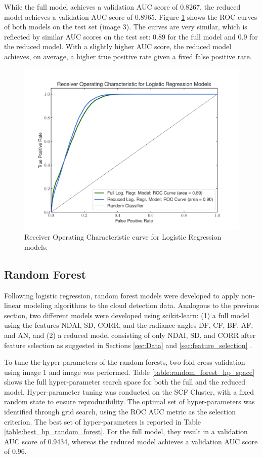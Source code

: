\documentclass[11pt,letterpaper]{article}
\begin{document}
While the full model achieves a validation AUC score of 0.8267, the reduced model achieves a validation AUC score of 0.8965. Figure \ref{fig_roc_loc_regr} shows the ROC curves of both models on the test set (image 3). The curves are very similar, which is reflected by similar AUC scores on the test set: 0.89 for the full model and 0.9 for the reduced model. With a slightly higher AUC score, the reduced model achieves, on average, a higher true positive rate given a fixed false positive rate.

\begin{figure}[H]
    \centering
    \includegraphics[width=\linewidth]{figs/roc_log_regr.pdf}
    \caption{Receiver Operating Characteristic curve for Logistic Regression models.}
    \label{fig_roc_loc_regr}
\end{figure}

\subsection{Random Forest}
Following logistic regression, random forest models were developed to apply non-linear modeling algorithms to the cloud detection data. Analogous to the previous section, two different models were developed using scikit-learn: (1) a full model using the features NDAI, SD, CORR, and the radiance angles DF, CF, BF, AF, and AN, and (2) a reduced model consisting of only NDAI, SD, and CORR after feature selection as suggested in Sections \ref{sec:Data} and \ref{sec:feature_selection} \parencite[]{scikit-learn}.

To tune the hyper-parameters of the random forests, two-fold cross-validation using image 1 and image was performed. Table \ref{table:random_forest_hp_space} shows the full hyper-parameter search space for both the full and the reduced model. Hyper-parameter tuning was conducted on the SCF Cluster, with a fixed random state to ensure reproducibility. The optimal set of hyper-parameters was identified through grid search, using the ROC AUC metric as the selection criterion. The best set of hyper-parameters is reported in Table \ref{table:best_hp_random_forest}. For the full model, they result in a validation AUC score of 0.9434, whereas the reduced model achieves a validation AUC score of 0.96.
\end{document}
